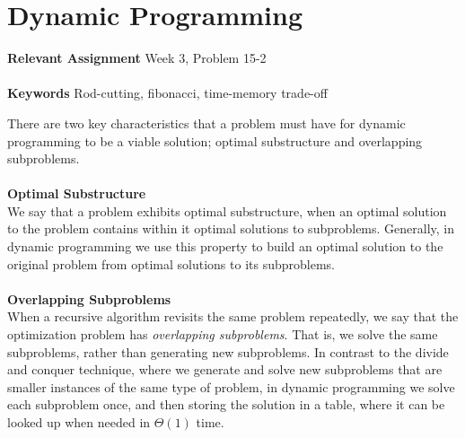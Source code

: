 
\chapter{Dynamic Programming}
\label{ch:dynamicprog}

\textbf{Relevant Assignment} Week 3, Problem 15-2\\\\
\textbf{Keywords} Rod-cutting, fibonacci, time-memory trade-off
\vspace{1in}

\noindent There are two key characteristics that a problem must have for
dynamic programming to be a viable solution; optimal substructure and
overlapping subproblems.
\\\\
\noindent \textbf{Optimal Substructure}\\
We say that a problem exhibits optimal substructure, when an optimal solution
to the problem contains within it optimal solutions to subproblems. Generally,
in dynamic programming we use this property to build an optimal solution to
the original problem from optimal solutions to its subproblems.
\\\\
\noindent \textbf{Overlapping Subproblems}\\
When a recursive algorithm revisits the same problem repeatedly, we say that
the optimization problem has \textit{overlapping subproblems}. That is, we
solve the same subproblems, rather than generating new subproblems. In
contrast to the divide and conquer technique, where we generate and solve new
subproblems that are smaller instances of the same type of problem, in dynamic
programming we solve each subproblem once, and then storing the solution in a
table, where it can be looked up when needed in $\Theta(1)$ time.

\newpage
